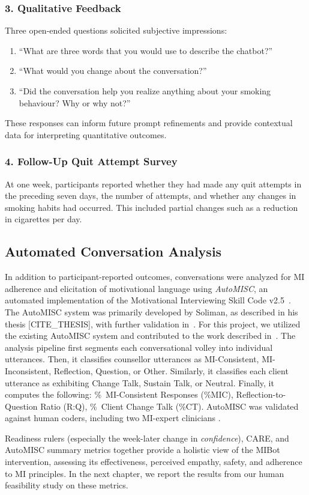 \subsubsection{3. Qualitative Feedback}
Three open-ended questions solicited subjective impressions:
\begin{enumerate}
    \item ``What are three words that you would use to describe the chatbot?''
    \item ``What would you change about the conversation?''
    \item ``Did the conversation help you realize anything about your smoking behaviour? Why or why not?''
\end{enumerate}
These responses can inform future prompt refinements and provide contextual data for interpreting quantitative outcomes.

\subsubsection{4. Follow-Up Quit Attempt Survey}
At one week, participants reported whether they had made any quit attempts in the preceding seven days, the number of attempts, and whether any changes in smoking habits had occurred. This included partial changes such as a reduction in cigarettes per day.

\subsection{Automated Conversation Analysis}
\label{subsec:automisc}
In addition to participant-reported outcomes, conversations were analyzed for MI adherence and elicitation of motivational language using \textit{AutoMISC}, an automated implementation of the Motivational Interviewing Skill Code v2.5~\citep{Houck2010}. The AutoMISC system was primarily developed by Soliman, as described in his thesis [CITE\_THESIS], with further validation in~\cite{ali2025automated}. For this project, we utilized the existing AutoMISC system and contributed to the work described in~\cite{mahmood-etal-2025-fully}. The analysis pipeline first segments each conversational volley into individual utterances. Then, it classifies counsellor utterances as MI-Consistent, MI-Inconsistent, Reflection, Question, or Other. Similarly, it classifies each client utterance as exhibiting Change Talk, Sustain Talk, or Neutral. Finally, it computes the following: \%~MI-Consistent Responses (\%MIC), Reflection-to-Question Ratio (R:Q), \%~Client Change Talk (\%CT). AutoMISC was validated against human coders, including two MI-expert clinicians \cite{mahmood-etal-2025-fully}.


Readiness rulers (especially the week-later change in \emph{confidence}), CARE, and AutoMISC summary metrics together provide a holistic view of the MIBot intervention, assessing its effectiveness, perceived empathy, safety, and adherence to MI principles. In the next chapter, we report the results from our human feasibility study on these metrics.
